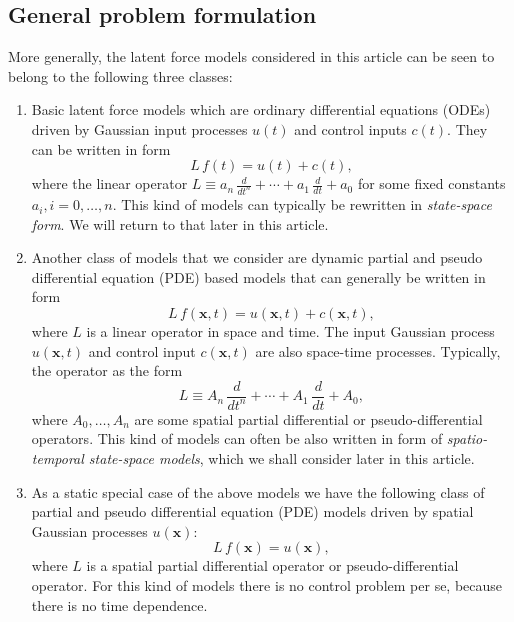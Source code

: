 \documentclass[journal]{IEEEtran}
\newcommand{\simo}[1]{{\color{red}#1}}
\begin{document}
\subsection{General problem formulation}
%
More generally, the latent force models considered in this article can be seen to belong to the following three classes:
%
\begin{enumerate}
\item Basic latent force models which are ordinary differential equations (ODEs) driven by Gaussian input processes $u(t)$ and control inputs $c(t)$. They can be written in form
%
\begin{equation}
  L \, f(t) = u(t) + c(t),
\end{equation}
%
where the linear operator $L\equiv a_n \, \frac{d}{dt^{n}} + \cdots + a_1 \, \frac{d}{dt} + a_0$ for some fixed constants $a_i, i=0,\ldots,n$. This kind of models can typically be rewritten in 
\emph{state-space form}. We will return to that later in this article.

\item Another class of models that we consider are dynamic partial and pseudo differential equation (PDE) based models that can generally be written in form
%
\begin{equation}
  L \, f(\mathbf{x},t) = u(\mathbf{x},t) + c(\mathbf{x},t),
\end{equation}
%
where $L$ is a linear operator in space and time. The input Gaussian process $u(\mathbf{x},t)$ and control input $c(\mathbf{x},t)$ are also space-time processes. Typically, the operator as the form
%
\begin{equation}
  L\equiv A_n \, \frac{d}{dt^{n}} + \cdots + A_1 \, \frac{d}{dt} + A_0,
\end{equation}
%
where $A_0,\ldots,A_n$ are some spatial partial differential or pseudo-differential operators. This kind of models can often be also written in form of \emph{spatio-temporal state-space models}, which we shall consider later in this article.

\item As a static special case of the above models we have the following class of partial and pseudo differential equation (PDE) models driven by spatial Gaussian processes $u(\mathbf{x})$:
%
\begin{equation}
  L \, f(\mathbf{x}) = u(\mathbf{x}),
\end{equation}
%
where $L$ is a spatial partial differential operator or pseudo-differential operator. For this kind of models there is no control problem per se, because there is no time dependence. 
\end{enumerate}
\end{document}
